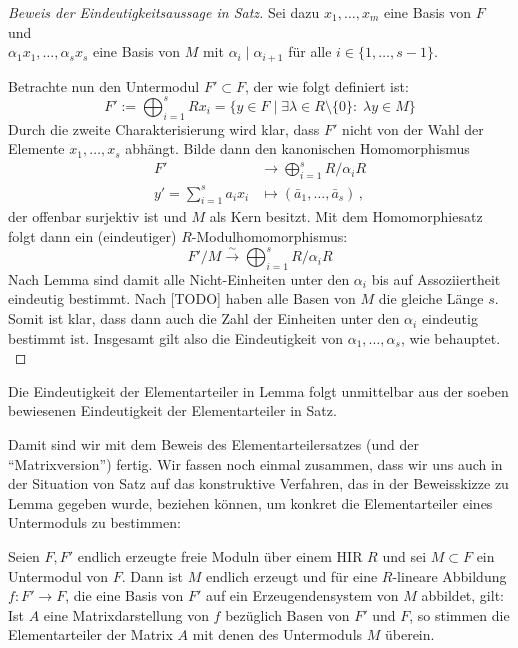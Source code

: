 \begin{proof}[Beweis der Eindeutigkeitsaussage in Satz] %
    Sei dazu $x_1,\ldots,x_m$ eine Basis von $F$ und\\
    $\alpha_1 x_1,\ldots,\alpha_s x_s$ eine Basis von $M$ mit
    $\alpha_i\mid\alpha_{i+1}$ für alle $i\in\{1,\ldots,s-1\}$.
    
    Betrachte nun den Untermodul $F'\subset F$, der wie folgt definiert ist:
    \[ F' := \bigoplus_{i=1}^s Rx_i 
        = \bigl\{ y\in F \;\big\vert\; \exists \lambda\in R\setminus\{0\}\colon
        \; \lambda y \in M \bigr\}  \]
    Durch die zweite Charakterisierung wird klar, dass $F'$ nicht von der Wahl
    der Elemente $x_1,\ldots,x_s$ abhängt.
    Bilde dann den kanonischen Homomorphismus
    \begin{align*}
        F' &\to \bigoplus_{i=1}^s R/\alpha_i R      \\
        y' = \sum_{i=1}^s a_ix_i &\mapsto (\bar{a}_1,\ldots,\bar{a}_s) \,,
    \end{align*}
    der offenbar surjektiv ist und $M$ als Kern besitzt. 
    Mit dem Homomorphiesatz %
    folgt dann ein (eindeutiger) $R$-Modulhomomorphismus:
    \[ F'/M \overset\sim\to \bigoplus_{i=1}^s R/\alpha_i R \]
    Nach Lemma %
    sind damit alle Nicht-Einheiten unter den $\alpha_i$ bis auf Assoziiertheit 
    eindeutig bestimmt. Nach [TODO] %
    haben alle Basen von $M$ die gleiche Länge $s$. Somit ist klar, dass dann
    auch die Zahl der Einheiten unter den $\alpha_i$ eindeutig bestimmt ist.
    Insgesamt gilt also die Eindeutigkeit von $\alpha_1,\ldots,\alpha_s$, wie
    behauptet.
    \\
\end{proof}

\begin{thKorollar} %
    Die Eindeutigkeit der Elementarteiler in Lemma %
    folgt unmittelbar aus der soeben bewiesenen Eindeutigkeit der
    Elementarteiler in Satz. %
\end{thKorollar}

Damit sind wir mit dem Beweis des Elementarteilersatzes (und der
\enquote{Matrixversion}) fertig. Wir fassen noch einmal zusammen, dass wir uns
auch in der Situation von Satz %
auf das konstruktive Verfahren, das in der Beweisskizze zu Lemma %
gegeben wurde, beziehen können, um konkret die Elementarteiler eines Untermoduls
zu bestimmen:

\begin{thKorollar}
    Seien $F,F'$ endlich erzeugte freie Moduln über einem HIR $R$ und sei
    $M\subset F$ ein Untermodul von $F$. Dann ist $M$ endlich erzeugt und für
    eine $R$-lineare Abbildung $f\colon F'\to F$, die eine Basis von $F'$ auf
    ein Erzeugendensystem von $M$ abbildet, gilt: Ist $A$ eine Matrixdarstellung
    von $f$ bezüglich Basen von $F'$ und $F$, so stimmen die Elementarteiler der
    Matrix $A$ mit denen des Untermoduls $M$ überein.
\end{thKorollar}








